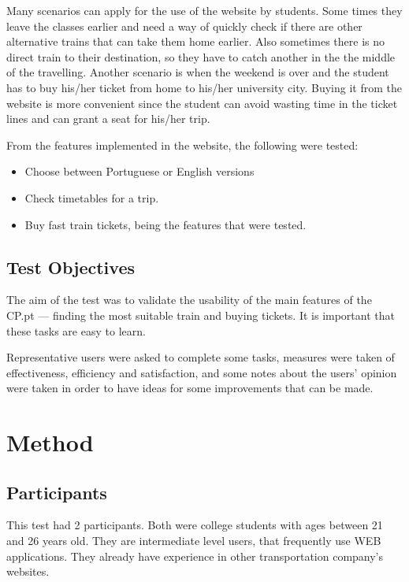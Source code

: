 \documentclass[a4paper]{article}
\begin{document}
Many scenarios can apply for the use of the website by students. Some times they leave the classes earlier and need a way of quickly check if there are other alternative trains that can take them home earlier. Also sometimes there is no direct train to their destination, so they have to catch another in the the middle of the travelling. Another scenario is when the weekend is over and the student has to buy his/her ticket from home to his/her university city. Buying it from the website is more convenient since the student can avoid wasting time in the ticket lines and can grant a seat for his/her trip.

From the features implemented in the website, the following were tested:
\begin{itemize}
  \item Choose between Portuguese or English versions
  \item Check timetables for a trip.
  \item Buy fast train tickets, being the features that were tested.
\end{itemize}


\subsection{Test Objectives}

The aim of the test was to validate the usability of the main features of the CP.pt --- finding the most suitable train and buying tickets. It is important that these tasks are easy to learn.

Representative users were asked to complete some tasks, measures were taken of effectiveness, efficiency and satisfaction, and some notes about the users' opinion were taken in order to have ideas for some improvements that can be made.

\section{Method}

\subsection{Participants}

This test had 2 participants. Both were college students with ages between 21 and 26 years old. They are intermediate level users, that frequently use WEB applications. They already have experience in other transportation company's websites.
\end{document}
